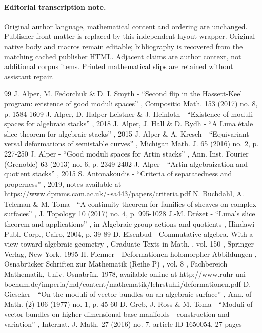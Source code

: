 \documentclass[11pt]{article}
\begin{document}
\paragraph{Editorial transcription note.}
Original author language, mathematical content and ordering are unchanged. Publisher front matter is replaced by this independent layout wrapper. Original native body and macros remain editable; bibliography is recovered from the matching cached publisher HTML. Adjacent claims are author context, not additional corpus items. Printed mathematical slips are retained without assistant repair.
\clearpage

\begin{thebibliography}{99}
 J. Alper, M. Fedorchuk \& D. I. Smyth - “Second flip in the Hassett-Keel program: existence of good moduli spaces” , Compositio Math. 153 (2017) no. 8, p. 1584-1609
 J. Alper, D. Halper-Leistner \& J. Heinloth - “Existence of moduli spaces for algebraic stacks” , 2018
 J. Alper, J. Hall \& D. Rydh - “A Luna étale slice theorem for algebraic stacks” , 2015
 J. Alper \& A. Kresch - “Equivariant versal deformations of semistable curves” , Michigan Math. J. 65 (2016) no. 2, p. 227-250
 J. Alper - “Good moduli spaces for Artin stacks” , Ann. Inst. Fourier (Grenoble) 63 (2013) no. 6, p. 2349-2402
 J. Alper - “Artin algebraization and quotient stacks” , 2015
 S. Antonakoudis - “Criteria of separatedness and properness” , 2019, notes available at https://www.dpmms.cam.ac.uk/\textasciitilde{}sa443/papers/criteria.pdf
 N. Buchdahl, A. Teleman \& M. Toma - “A continuity theorem for families of sheaves on complex surfaces” , J. Topology 10 (2017) no. 4, p. 995-1028
 J.-M. Drézet - “Luna’s slice theorem and applications” , in Algebraic group actions and quotients , Hindawi Publ. Corp., Cairo, 2004, p. 39-89
 D. Eisenbud - Commutative algebra. With a view toward algebraic geometry , Graduate Texts in Math. , vol. 150 , Springer-Verlag, New York, 1995
 H. Flenner - Deformationen holomorpher Abbildungen , Osnabrücker Schriften zur Mathematik (Reihe P) , vol. 8 , Fachbereich Mathematik, Univ. Osnabrük, 1978, available online at http://www.ruhr-uni-bochum.de/imperia/md/content/mathematik/lehrstuhli/deformationen.pdf
 D. Gieseker - “On the moduli of vector bundles on an algebraic surface” , Ann. of Math. (2) 106 (1977) no. 1, p. 45-60
 D. Greb, J. Ross \& M. Toma - “Moduli of vector bundles on higher-dimensional base manifolds—construction and variation” , Internat. J. Math. 27 (2016) no. 7, article ID 1650054, 27 pages

\end{thebibliography}
\end{document}
